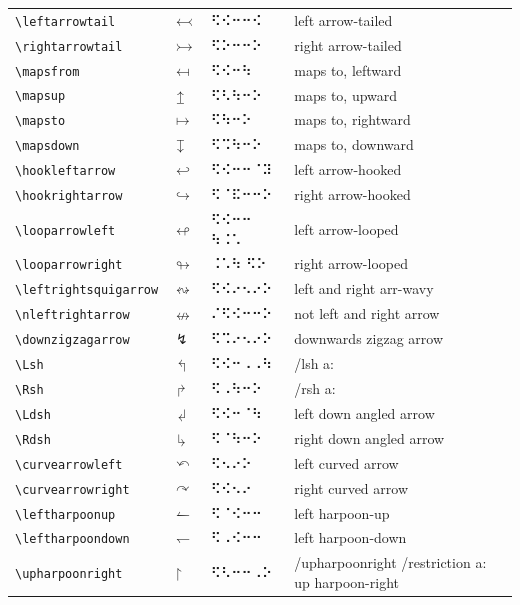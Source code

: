 \documentclass[oneside]{article}
\begin{document}
\begin{longtable}{llll}
\verb|\leftarrowtail| & $\leftarrowtail$ &   ⠫⠪⠒⠒⠪   & {left arrow-tailed} \\[2ex]
\verb|\rightarrowtail| & $\rightarrowtail$ &   ⠫⠕⠒⠒⠕   & {right arrow-tailed} \\[2ex]
\verb|\mapsfrom| & $\mapsfrom$ &   ⠫⠪⠒⠳   & {maps to, leftward} \\[2ex]
\verb|\mapsup| & $\mapsup$ &   ⠫⠣⠳⠒⠕   & {maps to, upward} \\[2ex]
\verb|\mapsto| & $\mapsto$ &   ⠫⠳⠒⠕   & {maps to, rightward} \\[2ex]
\verb|\mapsdown| & $\mapsdown$ &   ⠫⠩⠳⠒⠕   & {maps to, downward} \\[2ex]
\verb|\hookleftarrow| & $\hookleftarrow$ &   ⠫⠪⠒⠒⠈⠽   & {left arrow-hooked} \\[2ex]
\verb|\hookrightarrow| & $\hookrightarrow$ &   ⠫⠈⠯⠒⠒⠕   & {right arrow-hooked} \\[2ex]
\verb|\looparrowleft| & $\looparrowleft$ &   ⠫⠪⠒⠒ ⠳⠨⠡   & {left arrow-looped} \\[2ex]
\verb|\looparrowright| & $\looparrowright$ &   ⠨⠡⠳ ⠫⠕   & {right arrow-looped} \\[2ex]
\verb|\leftrightsquigarrow| & $\leftrightsquigarrow$ &   ⠫⠪⠔⠢⠔⠕   & {left and right arr-wavy} \\[2ex]
\verb|\nleftrightarrow| & $\nleftrightarrow$ &   ⠌⠫⠪⠒⠒⠕   & {not left and right arrow} \\[2ex]
\verb|\downzigzagarrow| & $\downzigzagarrow$ &   ⠫⠩⠔⠢⠔⠕   & {downwards zigzag arrow} \\[2ex]
\verb|\Lsh| & $\Lsh$ &   ⠫⠪⠒⠠⠠⠳   & {/lsh a:} \\[2ex]
\verb|\Rsh| & $\Rsh$ &   ⠫⠠⠳⠒⠕   & {/rsh a:} \\[2ex]
\verb|\Ldsh| & $\Ldsh$ &   ⠫⠪⠒⠈⠳   & {left down angled arrow} \\[2ex]
\verb|\Rdsh| & $\Rdsh$ &   ⠫⠈⠳⠒⠕   & {right down angled arrow} \\[2ex]
\verb|\curvearrowleft| & $\curvearrowleft$ &   ⠫⠢⠔⠕   & {left curved arrow} \\[2ex]
\verb|\curvearrowright| & $\curvearrowright$ &   ⠫⠪⠢⠔   & {right curved arrow} \\[2ex]
\verb|\leftharpoonup| & $\leftharpoonup$ &   ⠫⠈⠪⠒⠒   & {left harpoon-up} \\[2ex]
\verb|\leftharpoondown| & $\leftharpoondown$ &   ⠫⠠⠪⠒⠒   & {left harpoon-down} \\[2ex]
\verb|\upharpoonright| & $\upharpoonright$ &   ⠫⠣⠒⠒⠠⠕   & {/upharpoonright /restriction a: up harpoon-right} \\[2ex]

\end{longtable}
\end{document}
